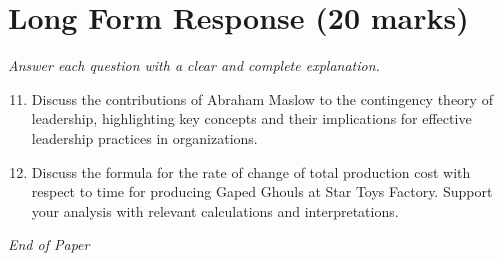 \documentclass[12pt]{article}
\begin{document}
\section*{Long Form Response (20 marks)}
\textit{Answer each question with a clear and complete explanation.}
\begin{enumerate}[label=\arabic*.]
\setcounter{enumi}{10}
\item Discuss the contributions of Abraham Maslow to the contingency theory of leadership, highlighting key concepts and their implications for effective leadership practices in organizations.
\item Discuss the formula for the rate of change of total production cost with respect to time for producing Gaped Ghouls at Star Toys Factory. Support your analysis with relevant calculations and interpretations.
\end{enumerate}

\vfill
\noindent\textit{End of Paper}
\end{document}
